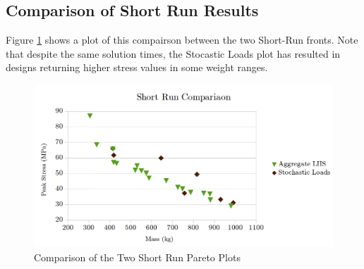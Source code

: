 \subsection{Comparison of Short Run Results}
Figure \ref{fig:pfront_comp_short} shows a plot of this compairson between the two Short-Run fronts. Note that despite the same solution times, the Stocastic Loads plot has resulted in designs returning higher stress values in some weight ranges. 

\begin{figure}[!htbp]
\includegraphics[width=\textwidth]{img/pf_comp_short.png}
\caption{Comparison of the Two Short Run Pareto Plots}
\label{fig:pfront_comp_short}
\end{figure}
